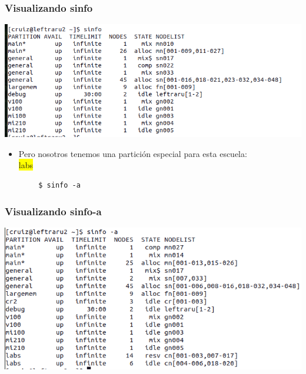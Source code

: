 \documentclass[aspectratio=169,professionalfonts]{beamer}
\newenvironment{minted}[2][]{\VerbatimEnvironment\begin{Verbatim}[#1]}{\end{Verbatim}}
\newcommand{\hl}[1]{\colorbox{yellow}{#1}}
\begin{document}
\begin{frame}[fragile]
\frametitle{\textbf{Visualizando sinfo}}
  \centering
    \includegraphics[scale=0.3]{FIGURES/sinfo.png}   
    \begin{itemize}
        \item Pero nosotros tenemos una partición especial para esta escuela:  \\ \hl{labs} 
    \end{itemize}
    \begin{verbatim}
        $ sinfo -a 
    \end{verbatim}
\end{frame}
\begin{frame}[fragile]
\frametitle{\textbf{Visualizando sinfo-a}}
\begin{center}
\includegraphics[scale=0.3]{FIGURES/sinfo-a.png}
\end{center}
\end{frame}
\end{document}
